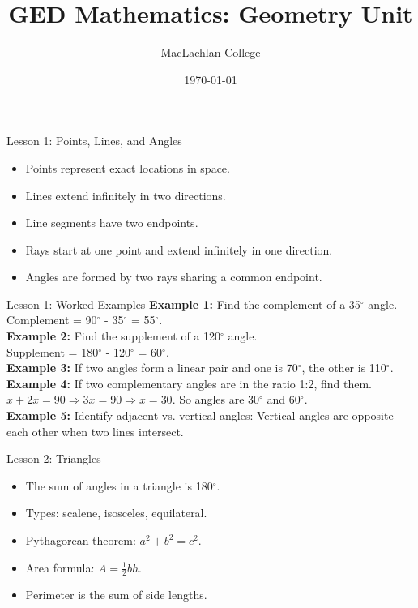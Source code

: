 \documentclass{beamer}
\title{GED Mathematics: Geometry Unit}
\author{MacLachlan College}
\date{\today}
\begin{document}
\frame{\titlepage}

\begin{frame}{Lesson 1: Points, Lines, and Angles}
\begin{itemize}
  \item Points represent exact locations in space.
  \item Lines extend infinitely in two directions.
  \item Line segments have two endpoints.
  \item Rays start at one point and extend infinitely in one direction.
  \item Angles are formed by two rays sharing a common endpoint.
\end{itemize}
\end{frame}

\begin{frame}{Lesson 1: Worked Examples}
\textbf{Example 1:} Find the complement of a 35$^\circ$ angle.\\
Complement = 90$^\circ$ - 35$^\circ$ = 55$^\circ$.\\[1em]
\textbf{Example 2:} Find the supplement of a 120$^\circ$ angle.\\
Supplement = 180$^\circ$ - 120$^\circ$ = 60$^\circ$.\\[1em]
\textbf{Example 3:} If two angles form a linear pair and one is 70$^\circ$, the other is 110$^\circ$.\\[1em]
\textbf{Example 4:} If two complementary angles are in the ratio 1:2, find them.\\
$x + 2x = 90 \Rightarrow 3x = 90 \Rightarrow x = 30$. So angles are 30$^\circ$ and 60$^\circ$.\\[1em]
\textbf{Example 5:} Identify adjacent vs. vertical angles: Vertical angles are opposite each other when two lines intersect.
\end{frame}

\begin{frame}{Lesson 2: Triangles}
\begin{itemize}
  \item The sum of angles in a triangle is 180$^\circ$.
  \item Types: scalene, isosceles, equilateral.
  \item Pythagorean theorem: $a^2 + b^2 = c^2$.
  \item Area formula: $A = \tfrac{1}{2}bh$.
  \item Perimeter is the sum of side lengths.
\end{itemize}
\end{frame}
\end{document}
